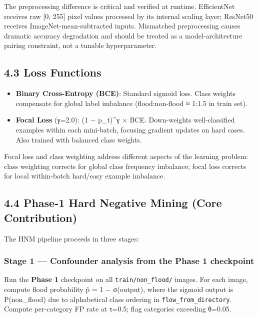 \documentclass[
  11pt,
]{article}
\providecommand{\tightlist}{%
  \setlength{\itemsep}{0pt}\setlength{\parskip}{0pt}}
\begin{document}
The preprocessing difference is critical and verified at runtime.
EfficientNet receives raw {[}0, 255{]} pixel values processed by its
internal scaling layer; ResNet50 receives ImageNet-mean-subtracted
inputs. Mismatched preprocessing causes dramatic accuracy degradation
and should be treated as a model-architecture pairing constraint, not a
tunable hyperparameter.

\subsection{4.3 Loss Functions}\label{loss-functions}

\begin{itemize}
\tightlist
\item
  \textbf{Binary Cross-Entropy (BCE)}: Standard sigmoid loss. Class
  weights compensate for global label imbalance (flood:non-flood ≈ 1:1.5
  in train set).
\item
  \textbf{Focal Loss} (γ=2.0): (1 − p\_t)\^{}γ × BCE. Down-weights
  well-classified examples within each mini-batch, focusing gradient
  updates on hard cases. Also trained with balanced class weights.
\end{itemize}

Focal loss and class weighting address different aspects of the learning
problem: class weighting corrects for global class frequency imbalance;
focal loss corrects for local within-batch hard/easy example imbalance.

\subsection{4.4 Phase-1 Hard Negative Mining (Core
Contribution)}\label{phase-1-hard-negative-mining-core-contribution}

The HNM pipeline proceeds in three stages:

\subsubsection{Stage 1 --- Confounder analysis from the Phase 1
checkpoint}\label{stage-1-confounder-analysis-from-the-phase-1-checkpoint}

Run the \textbf{Phase 1} checkpoint on all \texttt{train/non\_flood/}
images. For each image, compute flood probability p̂ = 1 − σ(output),
where the sigmoid output is P(non\_flood) due to alphabetical class
ordering in \texttt{flow\_from\_directory}. Compute per-category FP rate
at τ=0.5; flag categories exceeding θ=0.05.
\end{document}
